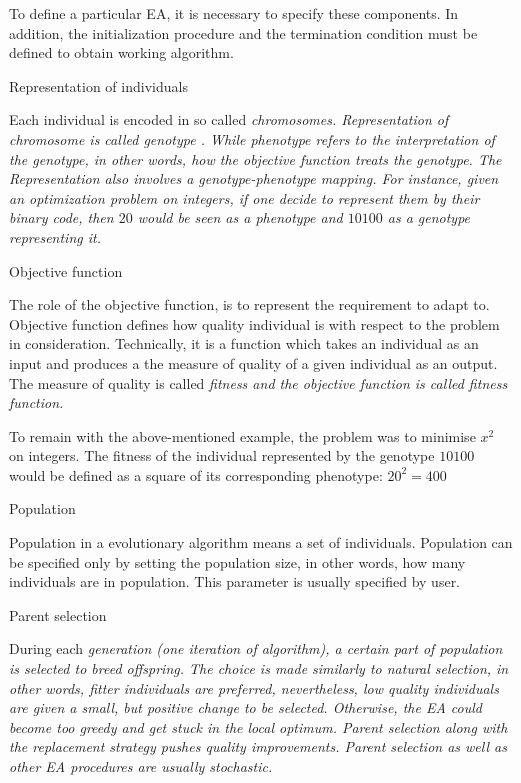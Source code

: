 To define a particular EA, it is necessary to specify these components. In addition,
the initialization procedure and the termination condition must be defined to obtain working
algorithm.

\secc Representation of individuals

Each individual is encoded in so called \em chromosomes\em. Representation of chromosome is
called \em genotype \em. While \em phenotype \em refers to the interpretation of the genotype,
in other words, how the objective function treats the genotype. The Representation also involves
a genotype-phenotype mapping. For instance, given an optimization problem on integers, if one
decide to represent them by their binary code, then $20$ would be seen as a phenotype 
and $10100$ as a genotype representing it.

\secc Objective function

The role of the objective function, is to represent the requirement to adapt to.
Objective function defines how quality individual is with respect to the problem
in consideration. Technically, it is a function which takes an individual as an input
and produces a the measure of quality of a given individual as an output. The measure of
quality is called \em fitness \em and the objective function is called \em fitness
function\em.

To remain with the above-mentioned example, the problem was to minimise $x^2$ on
integers. The fitness of the individual represented by the genotype $10100$ would be
defined as a square of its corresponding phenotype: $20^2 = 400$

\secc Population

Population in a evolutionary algorithm means a set of individuals. Population can be
specified only by setting the population size, in other words, how many individuals
are in population. This parameter is usually specified by user.

\secc Parent selection

During each \em generation \em (one iteration of algorithm), a certain part of population
is selected to breed offspring. 
The choice is made similarly to natural selection, in other words, fitter individuals
are preferred, nevertheless, low quality individuals are given a small, but positive change
to be selected. Otherwise, the EA could become too greedy and get stuck in the local optimum.
Parent selection along with the replacement strategy pushes quality improvements.
Parent selection as well as other EA procedures are usually stochastic.

